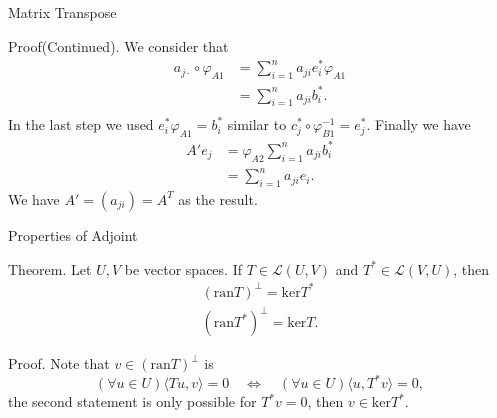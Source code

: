 \documentclass[hyperref={pdfpagelabels=true}]{beamer}
\renewcommand{\L}{\mathcal{L}}
\newcommand{\<}{\langle}
\renewcommand{\>}{\rangle}
\begin{document}
\begin{frame}{Matrix Transpose}
    \begin{block}{Proof(Continued).}
        We consider that 
        \[
            \begin{aligned}
                a_{j \cdot} \circ \varphi_{A1} &= \sum_{i = 1}^{n}a_{ji}e_{i}^{*}\varphi_{A1} \\
                &= \sum_{i = 1}^{n}a_{ji}b_{i}^{*}.\\
            \end{aligned} 
        \]
        In the last step we used $e_{i}^{*}\varphi_{A1} = b_{i}^{*}$ similar to $c_{j}^{*}\circ\varphi_{B1}^{-1} = e_{j}^{*}$. Finally we have
        \[
            \begin{aligned}
                A'e_{j} &= \varphi_{A2}\sum_{i = 1}^{n}a_{ji}b_{i}^{*}\\
                &= \sum_{i = 1}^{n}a_{ji}e_{i}.
            \end{aligned}
        \]
        We have $A' = (a_{ji}) = A^{T}$ as the result.
        \end{block}
    \end{frame}
\begin{frame}{Properties of Adjoint}
    \begin{block}{Theorem.}
        Let $U,V$ be vector spaces. If $T \in \L(U,V)$ and $T^{*} \in \L(V,U)$, then
        \[
            \begin{aligned}
                (\text{ran}T)^{\bot} = \text{ker} T^{*} \\
                (\text{ran}T^{*})^{\bot} = \text{ker} T.
            \end{aligned}
        \]
        \end{block}
        \begin{block}{Proof.}
            Note that $v \in (\text{ran}T)^{\bot}$ is 
            \[(\forall u \in U)\<Tu,v\> = 0 \quad \Leftrightarrow \quad (\forall u \in U)\<u,T^{*}v\> = 0,\]
            the second statement is only possible for $T^{*}v = 0$, then $v \in \text{ker}T^{*}.$
        \end{block}
        \end{frame}
\end{document}
